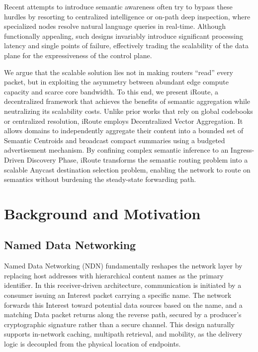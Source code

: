 \documentclass[conference]{IEEEtran}
\newcommand{\sysname}{iRoute}
\begin{document}
Recent attempts to introduce semantic awareness often try to bypass these hurdles by resorting to centralized intelligence or on-path deep inspection, where specialized nodes resolve natural language queries in real-time. Although functionally appealing, such designs invariably introduce significant processing latency and single points of failure, effectively trading the scalability of the data plane for the expressiveness of the control plane.

We argue that the scalable solution lies not in making routers ``read'' every packet, but in exploiting the asymmetry between abundant edge compute capacity and scarce core bandwidth. To this end, we present \sysname{}, a decentralized framework that achieves the benefits of semantic aggregation while neutralizing its scalability costs. Unlike prior works that rely on global codebooks or centralized resolution, \sysname{} employs Decentralized Vector Aggregation. It allows domains to independently aggregate their content into a bounded set of Semantic Centroids and broadcast compact summaries using a budgeted advertisement mechanism. By confining complex semantic inference to an Ingress-Driven Discovery Phase, \sysname{} transforms the semantic routing problem into a scalable Anycast destination selection problem, enabling the network to route on semantics without burdening the steady-state forwarding path.

\section{Background and Motivation}
\label{sec:background}

\subsection{Named Data Networking}
\label{sec:background_ndn}

Named Data Networking (NDN) fundamentally reshapes the network layer by replacing host addresses with hierarchical content names as the primary identifier. In this receiver-driven architecture, communication is initiated by a consumer issuing an Interest packet carrying a specific name. The network forwards this Interest toward potential data sources based on the name, and a matching Data packet returns along the reverse path, secured by a producer's cryptographic signature rather than a secure channel. This design naturally supports in-network caching, multipath retrieval, and mobility, as the delivery logic is decoupled from the physical location of endpoints.
\end{document}
